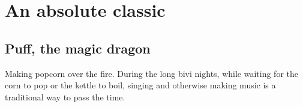 \section{An absolute classic}
\subsection{Puff, the magic dragon}

\begin{marginfigure}
      \checkoddpage \ifoddpage \forcerectofloat \else \forceversofloat \fi
      \centering
  \caption{Making popcorn over the fire. During the long bivi nights, while waiting for the corn to pop or the kettle to boil, singing and otherwise making music is a traditional way to pass the time. }
\end{marginfigure}

